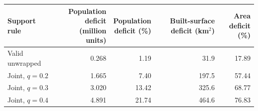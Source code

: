 \begin{tabular}{lrrrr}\toprule
Support rule & \shortstack{Population deficit\\(million units)} & \shortstack{Population\\deficit (\%)} & \shortstack{Built-surface deficit\\(km$^2$)} & \shortstack{Area\\deficit (\%)}\\\midrule
Valid unwrapped & 0.268 & 1.19 & 31.9 & 17.89 \\
Joint, $q=0.2$ & 1.665 & 7.40 & 197.5 & 57.44 \\
Joint, $q=0.3$ & 3.020 & 13.42 & 325.6 & 68.77 \\
Joint, $q=0.4$ & 4.891 & 21.74 & 464.6 & 76.83 \\
\bottomrule\end{tabular}
